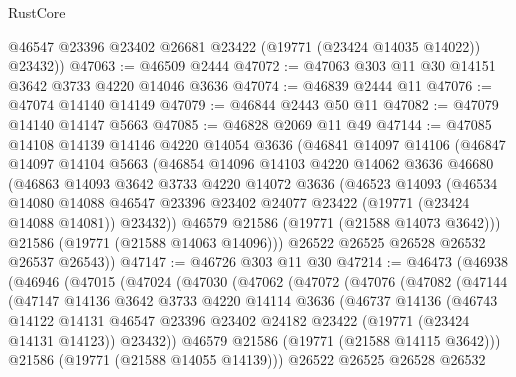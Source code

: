 \begin{lexlean}{RustCore}
\begin{coremodule}
        @46547
        @23396
        @23402
        @26681
        @23422
        (@19771 (@23424 @14035 @14022))
        @23432))
@47063 := @46509 @2444
@47072 := @47063 @303 @11 @30 @14151 @3642 @3733 @4220 @14046 @3636
@47074 := @46839 @2444 @11
@47076 := @47074 @14140 @14149
@47079 := @46844 @2443 @50 @11
@47082 := @47079 @14140 @14147 @5663
@47085 := @46828 @2069 @11 @49
@47144 := @47085
    @14108
    @14139
    @14146
    @4220
    @14054
    @3636
    (@46841
      @14097
      @14106
      (@46847
        @14097
        @14104
        @5663
        (@46854
          @14096
          @14103
          @4220
          @14062
          @3636
          @46680
          (@46863
            @14093
            @3642
            @3733
            @4220
            @14072
            @3636
            (@46523
              @14093
              (@46534
                @14080
                @14088
                @46547
                @23396
                @23402
                @24077
                @23422
                (@19771 (@23424 @14088 @14081))
                @23432))
            @46579
            @21586
            (@19771 (@21588 @14073 @3642)))
          @21586
          (@19771 (@21588 @14063 @14096)))
        @26522
        @26525
        @26528
        @26532
        @26537
        @26543))
@47147 := @46726 @303 @11 @30
@47214 := @46473
    (@46938
      (@46946
        (@47015
          (@47024
            (@47030
              (@47062
                (@47072
                  (@47076
                    (@47082
                      (@47144
                        (@47147
                          @14136
                          @3642
                          @3733
                          @4220
                          @14114
                          @3636
                          (@46737
                            @14136
                            (@46743
                              @14122
                              @14131
                              @46547
                              @23396
                              @23402
                              @24182
                              @23422
                              (@19771 (@23424 @14131 @14123))
                              @23432))
                          @46579
                          @21586
                          (@19771 (@21588 @14115 @3642)))
                        @21586
                        (@19771 (@21588 @14055 @14139)))
                      @26522
                      @26525
                      @26528
                      @26532

\end{coremodule}
\end{lexlean}
